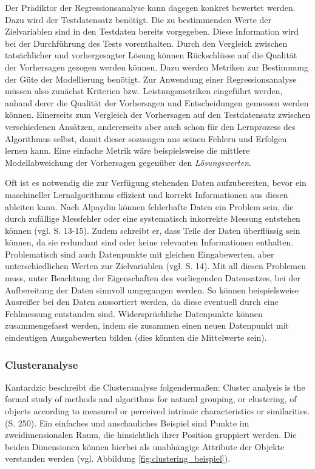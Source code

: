 \documentclass[
	12pt,
	a4paper,
	BCOR10mm,
	DIV14,
	listof=totoc,
	bibliography=totoc,
	headsepline
]{scrreprt}
\begin{document}
Der Prädiktor der Regressionsanalyse kann dagegen konkret bewertet werden. Dazu wird der Testdatensatz benötigt. Die zu bestimmenden Werte der Zielvariablen sind in den Testdaten bereits vorgegeben.
Diese Information wird bei der Durchführung des Tests vorenthalten. Durch den Vergleich zwischen tatsächlicher und vorhergesagter Lösung können Rückschlüsse auf die Qualität der Vorhersagen gezogen werden können. Dazu werden Metriken zur Bestimmung der Güte der Modellierung benötigt.
Zur Anwendung einer Regressionsanalyse müssen also zunächst Kriterien bzw. Leistungsmetriken eingeführt werden, anhand derer die Qualität der Vorhersagen und Entscheidungen gemessen werden können. Einerseits zum Vergleich der Vorhersagen auf den Testdatensatz zwischen verschiedenen Ansätzen, andererseits aber auch schon für den Lernprozess des Algorithmus selbst, damit dieser sozusagen aus seinen Fehlern und Erfolgen lernen kann. Eine einfache Metrik wäre beispielsweise die mittlere Modellabweichung der Vorhersagen gegenüber den \textit{Lösungswerten}.
\medskip

Oft ist es notwendig die zur Verfügung stehenden Daten aufzubereiten, bevor ein maschineller Lernalgorithmus effizient und korrekt Informationen aus diesen ableiten kann.
Nach Alpaydin können fehlerhafte Daten ein Problem sein, die durch zufällige Messfehler oder eine systematisch inkorrekte Messung entstehen können (vgl. \cite{Alpaydin:2010:IML:1734076} S. 13-15). Zudem schreibt er, dass Teile der Daten überflüssig sein können, da sie redundant sind oder keine relevanten Informationen enthalten. Problematisch sind auch Datenpunkte mit gleichen Eingabewerten, aber unterschiedlichen Werten zur Zielvariablen (vgl. \cite{Alpaydin:2010:IML:1734076} S. 14).
Mit all diesen Problemen muss, unter Beachtung der Eigenschaften des vorliegenden Datensatzes, bei der Aufbereitung der Daten sinnvoll umgegangen werden. So können beispielsweise Ausreißer bei den Daten aussortiert werden, da diese eventuell durch eine Fehlmessung entstanden sind. Widersprüchliche Datenpunkte können zusammengefasst werden, indem sie zusammen einen neuen Datenpunkt mit eindeutigen Ausgabewerten bilden (dies könnten die Mittelwerte sein).

\subsubsection{Clusteranalyse}
Kantardzic beschreibt die Clusteranalyse folgendermaßen: \glqq Cluster analysis is the formal study of methods and algorithms for natural grouping, or clustering, of objects according to measured or perceived intrinsic characteristics or similarities.\grqq{} \cite{kantardzic2011data} (S. 250). Ein einfaches und anschauliches Beispiel sind Punkte im zweidimensionalen Raum, die hinsichtlich ihrer Position gruppiert werden. Die beiden Dimensionen können hierbei als unabhängige Attribute der Objekte verstanden werden (vgl. Abbildung \ref{fig:clustering_beispiel}).
\end{document}
